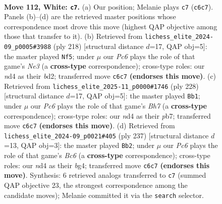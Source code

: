 \documentclass[11pt]{article}
\begin{document}
\clearpage

\begin{figure}[p]\centering
\begin{subfigure}{0.46\textwidth}\centering
\resizebox{\linewidth}{!}{%
\newchessgame
\chessboard[
  setfen={B7/6k1/2P5/6P1/3n2KP/8/8/8 w - - 1 112},
  showmover=false,
  pgfstyle=straightmove, color=movearrow, markmove={c6-c7}
]}
\caption{}
\end{subfigure}\hfill
\begin{subfigure}{0.46\textwidth}\centering
\resizebox{\linewidth}{!}{%
\newchessgame
\chessboard[
  setfen={8/8/8/2k5/P7/KP2N3/3b4/8 w - - 49 110},
  showmover=false,
  pgfstyle=straightmove, color=movearrow, markmove={e3-f5}
]}
\caption{}
\end{subfigure}
\\[4pt]
\begin{subfigure}{0.46\textwidth}\centering
\resizebox{\linewidth}{!}{%
\newchessgame
\chessboard[
  setfen={1k6/1p5B/3P4/2PK2b1/8/8/8/8 w - - 29 115},
  showmover=false,
  pgfstyle=straightmove, color=movearrow, markmove={h7-b1}
]}
\caption{}
\end{subfigure}\hfill
\begin{subfigure}{0.46\textwidth}\centering
\resizebox{\linewidth}{!}{%
\newchessgame
\chessboard[
  setfen={8/4k3/5p2/3K2p1/6B1/2b5/8/8 b - - 45 119},
  showmover=false,
  pgfstyle=straightmove, color=movearrow, markmove={c3-b2}
]}
\caption{}
\end{subfigure}
\caption{\textbf{Move 112, White: \texttt{c7}.} (a) Our position; Melanie plays \texttt{c7} (\texttt{c6c7}). Panels (b)--(d) are the retrieved master positions whose correspondence most drove this move (highest QAP objective among those that transfer to it). (b) Retrieved from \texttt{lichess\_elite\_2024-09\_p0005\#3988} (ply 218) [structural distance $d$=17, QAP obj=5]: the master played \texttt{Nf5}; under $\mu$ our \emph{Pc6} plays the role of that game's \emph{Ne3} (a \textbf{cross-type} correspondence); cross-type roles: our \emph{n}d4 as their \emph{b}d2; transferred move \texttt{c6c7} \textbf{(endorses this move)}. (c) Retrieved from \texttt{lichess\_elite\_2025-11\_p0000\#1746} (ply 228) [structural distance $d$=17, QAP obj=5]: the master played \texttt{Bb1}; under $\mu$ our \emph{Pc6} plays the role of that game's \emph{Bh7} (a \textbf{cross-type} correspondence); cross-type roles: our \emph{n}d4 as their \emph{p}b7; transferred move \texttt{c6c7} \textbf{(endorses this move)}. (d) Retrieved from \texttt{lichess\_elite\_2024-09\_p0021\#405} (ply 237) [structural distance $d$=13, QAP obj=3]: the master played \texttt{Bb2}; under $\mu$ our \emph{Pc6} plays the role of that game's \emph{Bc6} (a \textbf{cross-type} correspondence); cross-type roles: our \emph{n}d4 as their \emph{b}g4; transferred move \texttt{c6c7} \textbf{(endorses this move)}. Synthesis: 6 retrieved analogs transferred to \texttt{c7} (summed QAP objective 23, the strongest correspondence among the candidate moves); Melanie committed it via the \texttt{search} selector.}
\label{fig:thought-m222}
\end{figure}
\end{document}
